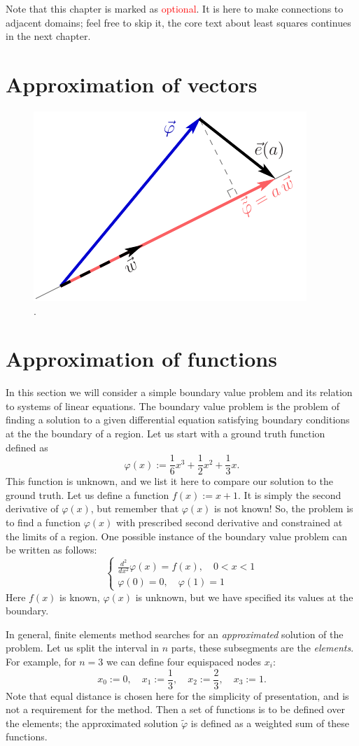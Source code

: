 \documentclass[notitlepage,oneside]{book}
\begin{document}
Note that this chapter is marked as \textcolor{red}{optional}.
It is here to make connections to adjacent domains; feel free to skip it, the core text about least squares continues in the next chapter.

\section{Approximation of vectors}

\begin{figure}[ht]
	\centering
	\includegraphics[width=.3\linewidth]{vector_approximation.pdf}
	\caption{.}
	\label{fig:vector_approximation}
\end{figure}


\section{Approximation of functions}

In this section we will consider a simple boundary value problem and its relation to systems of linear equations.
The boundary value problem is the problem of finding a solution to a given differential equation satisfying boundary conditions at the the boundary of a region.
Let us start with a ground truth function defined as 
$$
\varphi(x) := \frac{1}{6} x^3 + \frac{1}{2} x^2 + \frac{1}{3} x.
$$
This function is unknown, and we list it here to compare our solution to the ground truth.
Let us define a function $f(x) := x+1$.
It is simply the second derivative of $\varphi(x)$, but remember that $\varphi(x)$ is not known!
So, the problem is to find a function $\varphi(x)$ with prescribed second derivative and constrained at the limits of a region.
One possible instance of the boundary value problem can be written as follows:
$$
\left\{
\begin{split}
\frac{d^2}{dx^2}\varphi(x) = f(x), \quad 0 < x < 1\\
\varphi(0)=0, \quad \varphi(1)=1
\end{split}
\right.
$$
Here $f(x)$ is known, $\varphi(x)$ is unknown, but we have specified its values at the boundary.

In general, finite elements method searches for an \textit{approximated} solution of the problem.
Let us split the interval in $n$ parts, these subsegments are the \textit{elements}.
For example, for $n=3$ we can define four equispaced nodes $x_i$:
$$
x_0 := 0, \quad x_1 := \frac{1}{3}, \quad x_2 := \frac{2}{3}, \quad x_3 := 1.
$$
Note that equal distance is chosen here for the simplicity of presentation, and is not a requirement for the method.
Then a set of functions is to be defined over the elements; the approximated solution $\tilde{\varphi}$ is defined as a weighted sum of these functions.
\end{document}
